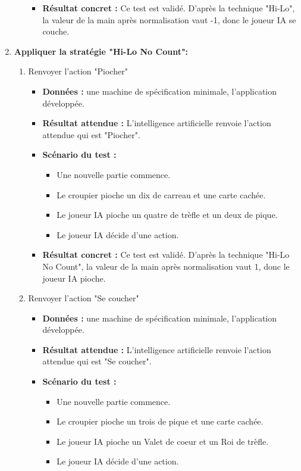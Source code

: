 \begin{enumerate}
\begin{enumerate}
\begin{itemize}
            \item \textbf{Résultat concret : } Ce test est validé. D'après la technique "Hi-Lo", la valeur de la main après normalisation vaut -1, donc le joueur IA se couche.
        \end{itemize}
    
    \end{enumerate}
    
    \item \textbf{Appliquer la stratégie "Hi-Lo No Count":} 
    
    \begin{enumerate}
        \item Renvoyer l'action "Piocher"
        \begin{itemize}
            \item \textbf{Données :} une machine de spécification minimale, l'application développée.
            \item \textbf{Résultat attendue :} L'intelligence artificielle renvoie l'action attendue qui est "Piocher".
            \item \textbf{Scénario du test :}
            \begin{itemize}
                \item Une nouvelle partie commence.
                \item Le croupier pioche un dix de carreau et une carte cachée.
                \item Le joueur IA pioche un quatre de trèfle et un deux de pique.
                \item Le joueur IA décide d'une action.
            \end{itemize}
            
            \item \textbf{Résultat concret : } Ce test est validé. D'après la technique "Hi-Lo No Count", la valeur de la main après normalisation vaut 1, donc le joueur IA pioche.
        \end{itemize}

        \item Renvoyer l'action "Se coucher"
        \begin{itemize}
            \item \textbf{Données :} une machine de spécification minimale, l'application développée.
            \item \textbf{Résultat attendue :} L'intelligence artificielle renvoie l'action attendue qui est "Se coucher".
            \item \textbf{Scénario du test :}
            \begin{itemize}
                \item Une nouvelle partie commence.
                \item Le croupier pioche un trois de pique et une carte cachée.
                \item Le joueur IA pioche un Valet de coeur et un Roi de trèfle.
                \item Le joueur IA décide d'une action.
            \end{itemize}
            

\end{itemize}
\end{enumerate}
\end{enumerate}

